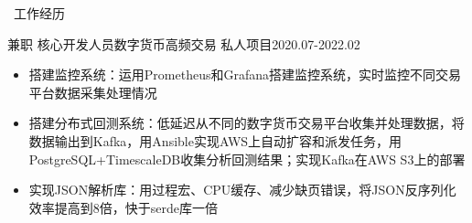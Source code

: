 \documentclass[UTF8]{resume}
\begin{document}
\begin{rSection}{\faBriefcase~工作经历}
\begin{rExperience}{兼职 核心开发人员}{数字货币高频交易 私人项目}{2020.07-2022.02}
\begin{itemize}
            \item 搭建监控系统：运用Prometheus和Grafana搭建监控系统，实时监控不同交易平台数据采集处理情况
            \item 搭建分布式回测系统：低延迟从不同的数字货币交易平台收集并处理数据，将数据输出到Kafka，用Ansible实现AWS上自动扩容和派发任务，用PostgreSQL+TimescaleDB收集分析回测结果；实现Kafka在AWS S3上的部署
            \item 实现JSON解析库：用过程宏、CPU缓存、减少缺页错误，将JSON反序列化效率提高到8倍，快于serde库一倍 
        \end{itemize}
    \end{rExperience}
\end{rSection}
\end{document}
